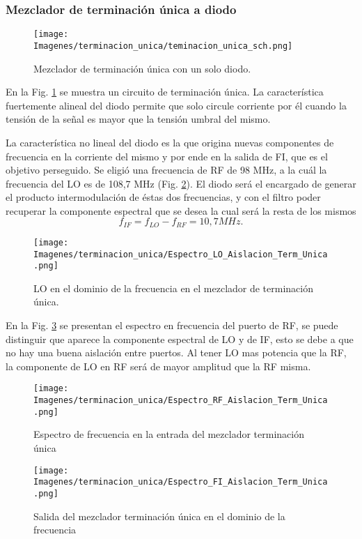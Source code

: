 \documentclass[conference]{IEEEtran}
\begin{document}
\subsubsection{Mezclador de terminación única a diodo}
			
			\begin{figure}[h!]
			\centering
			\texttt{[image: Imagenes/terminacion\_unica/teminacion\_unica\_sch.png]} 
			\caption{Mezclador de terminación única con un solo diodo.}
			\label{esq1}
			\end{figure}

En la Fig. \ref{esq1} se muestra un circuito de terminación única. La característica fuertemente alineal del diodo permite que solo circule corriente por él cuando la tensión de la señal es mayor que la tensión umbral del mismo.
 
La  característica  no  lineal  del  diodo  es  la  que  origina  nuevas  componentes  de  frecuencia  en  la  corriente  del mismo y por ende en la salida de FI, que es el objetivo perseguido. Se eligió una frecuencia de RF de 98 MHz, a la cuál la frecuencia del LO es de 108,7 MHz (Fig. \ref{LO_termUnica}). El diodo será el encargado de generar  el producto intermodulación de éstas dos frecuencias, y con el filtro poder recuperar la componente espectral que se desea la cual será la resta de los mismos 
$$ f_{IF} = f_{LO} - f_{RF} = 10,7 MHz. $$

\begin{figure}[h!]
\texttt{[image: Imagenes/terminacion\_unica/Espectro\_LO\_Aislacion\_Term\_Unica.png]}
\caption{LO en el dominio de la frecuencia en el mezclador de terminación única.}
\label{LO_termUnica}
\end{figure}

En la Fig. \ref{RF_termUnica} se presentan el espectro en frecuencia del puerto de RF, se puede distinguir que aparece la componente espectral de LO y de IF, esto se debe a que no hay una buena aislación entre puertos. Al tener LO mas potencia que la RF, la componente de LO en RF será de mayor amplitud que la RF misma.

\begin{figure}[h]
\texttt{[image: Imagenes/terminacion\_unica/Espectro\_RF\_Aislacion\_Term\_Unica.png]} 
\caption{Espectro de frecuencia en la entrada del mezclador terminación única}
\label{RF_termUnica}
\end{figure}

\begin{figure}[h]
\texttt{[image: Imagenes/terminacion\_unica/Espectro\_FI\_Aislacion\_Term\_Unica.png]} 
\caption{Salida del mezclador terminación única en el dominio de la frecuencia}
\label{FI_termUnica}
\end{figure}
\end{document}
